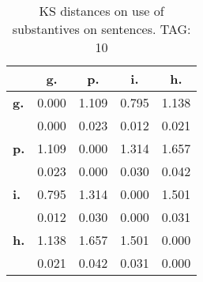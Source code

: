 \begin{table}[h!]
\begin{center}
\begin{tabular}{| l || c | c | c | c |}\hline
 & {\bf g.} & {\bf p.} & {\bf i.} & {\bf h.} \\\hline\hline
{\bf g.} & 0.000 & 1.109 & 0.795 & 1.138 \\
{\bf } & 0.000 & 0.023 & 0.012 & 0.021 \\\hline
{\bf p.} & 1.109 & 0.000 & 1.314 & 1.657 \\
{\bf } & 0.023 & 0.000 & 0.030 & 0.042 \\\hline
{\bf i.} & 0.795 & 1.314 & 0.000 & 1.501 \\
{\bf } & 0.012 & 0.030 & 0.000 & 0.031 \\\hline
{\bf h.} & 1.138 & 1.657 & 1.501 & 0.000 \\
{\bf } & 0.021 & 0.042 & 0.031 & 0.000 \\\hline
\end{tabular}
\caption{KS distances on use of substantives on sentences. TAG: 10}
\end{center}
\end{table}